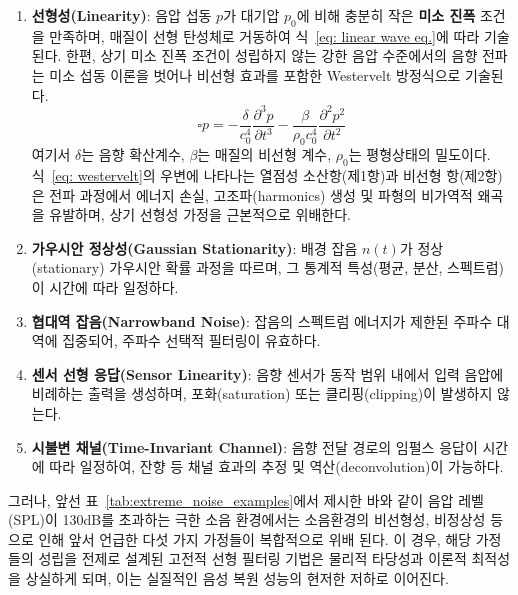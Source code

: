 \documentclass{article}
\begin{document}
\begin{enumerate}
    \item \textbf{선형성(Linearity)}: 음압 섭동 $p$가 대기압 $p_0$에 비해 충분히 작은 \textbf{미소 진폭} 조건을 만족하며, 매질이 선형 탄성체로 거동하여 식~\eqref{eq: linear wave eq.}에 따라 기술된다.
    한편, 상기 미소 진폭 조건이 성립하지 않는 강한 음압 수준에서의 음향 전파는 미소 섭동 이론을 벗어나 비선형 효과를 포함한 Westervelt 방정식으로 기술된다.
    \begin{equation}\label{eq: westervelt}
        \square p = -\frac{\delta}{c_0^4}\frac{\partial^3 p}{\partial t^3} - \frac{\beta}{\rho_0 c_0^4}\frac{\partial^2 p^2}{\partial t^2}
    \end{equation}
    여기서 $\delta$는 음향 확산계수, $\beta$는 매질의 비선형 계수, $\rho_{0}$는 평형상태의 밀도이다. 
    식~\eqref{eq: westervelt}의 우변에 나타나는 열점성 소산항(제1항)과 비선형 항(제2항)은 전파 과정에서 에너지 손실, 고조파(harmonics) 생성 및 파형의 비가역적 왜곡을 유발하며, 상기 선형성 가정을 근본적으로 위배한다.
    
    \item \textbf{가우시안 정상성(Gaussian Stationarity)}: 배경 잡음 $n(t)$가 정상(stationary) 가우시안 확률 과정을 따르며, 그 통계적 특성(평균, 분산, 스펙트럼)이 시간에 따라 일정하다.
    
    \item \textbf{협대역 잡음(Narrowband Noise)}: 잡음의 스펙트럼 에너지가 제한된 주파수 대역에 집중되어, 주파수 선택적 필터링이 유효하다.
    
    \item \textbf{센서 선형 응답(Sensor Linearity)}: 음향 센서가 
    동작 범위 내에서 입력 음압에 비례하는 출력을 생성하며, 
    포화(saturation) 또는 클리핑(clipping)이 발생하지 않는다.
    \item \textbf{시불변 채널(Time-Invariant Channel)}: 음향 전달 경로의 
    임펄스 응답이 시간에 따라 일정하여, 잔향 등 채널 효과의 추정 및 
    역산(deconvolution)이 가능하다.
\end{enumerate}
그러나, 앞선 표~\ref{tab:extreme_noise_examples}에서 제시한 바와 같이 음압 레벨(SPL)이 130dB를 초과하는 극한 소음 환경에서는 소음환경의 비선형성, 비정상성 등으로 인해 앞서 언급한 다섯 가지 가정들이 복합적으로 위배 된다.
이 경우, 해당 가정들의 성립을 전제로 설계된 고전적 선형 필터링 기법은 물리적 타당성과 이론적 최적성을 상실하게 되며, 이는 실질적인 음성 복원 성능의 현저한 저하로 이어진다.
\end{document}
